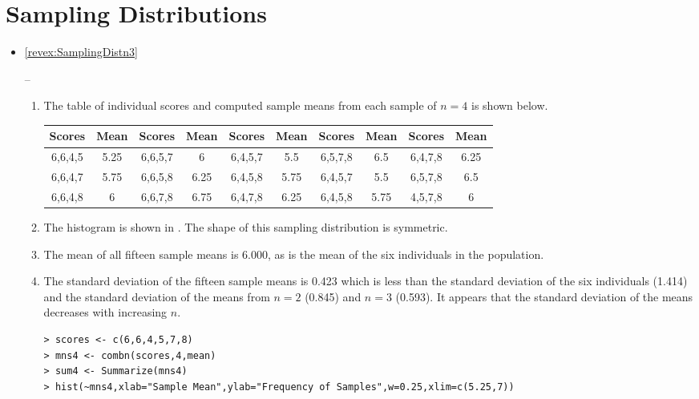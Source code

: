 \documentclass[10pt,openany]{book}\usepackage[]{graphicx}\usepackage[]{color}
\makeatletter
\newenvironment{kframe}{%
 \def\at@end@of@kframe{}%
 \ifinner\ifhmode%
  \def\at@end@of@kframe{\end{minipage}}%
  \begin{minipage}{\columnwidth}%
 \fi\fi%
 \def\FrameCommand##1{\hskip\@totalleftmargin \hskip-\fboxsep
 \colorbox{shadecolor}{##1}\hskip-\fboxsep
     \hskip-\linewidth \hskip-\@totalleftmargin \hskip\columnwidth}%
 \MakeFramed {\advance\hsize-\width
   \@totalleftmargin\z@ \linewidth\hsize
   \@setminipage}}%
 {\par\unskip\endMakeFramed%
 \at@end@of@kframe}
\newenvironment{knitrout}{}{} %
\makeatother
\begin{document}
\section*{Sampling Distributions}
\begin{itemize}
  \item \hypertarget{ans:SamplingDistn3}{\ref{revex:SamplingDistn3}} --
    \begin{enumerate}
      \item The table of individual scores and computed sample means from each sample of $n=4$ is shown below.
      \begin{center}
        \begin{tabular}{cc||cc||cc||cc||cc}
\hline\hline
Scores & Mean & Scores & Mean & Scores &  Mean & Scores & Mean & Scores & Mean \\
\hline
6,6,4,5 & 5.25 & 6,6,5,7 & 6    & 6,4,5,7 & 5.5  & 6,5,7,8 & 6.5  & 6,4,7,8 & 6.25 \\
6,6,4,7 & 5.75 & 6,6,5,8 & 6.25 & 6,4,5,8 & 5.75 & 6,4,5,7 & 5.5  & 6,5,7,8 & 6.5  \\
6,6,4,8 & 6    & 6,6,7,8 & 6.75 & 6,4,7,8 & 6.25 & 6,4,5,8 & 5.75 & 4,5,7,8 & 6    \\
\hline\hline
         \end{tabular}
      \end{center}

      \item The histogram is shown in .  The shape of this sampling distribution is symmetric.
\begin{knitrout}
\color{fgcolor}\begin{kframe}


{\ttfamily\noindent\bfseries\color{errorcolor}{Error: Variable must be numeric.}}\end{kframe}
\end{knitrout}
      \item The mean of all fifteen sample means is 6.000, as is the mean of the six individuals in the population.
      \item The standard deviation of the fifteen sample means is 0.423 which is less than the standard deviation of the six individuals (1.414) and the standard deviation of the means from $n=2$ (0.845) and $n=3$ (0.593).  It appears that the standard deviation of the means decreases with increasing $n$.
\begin{knitrout}
\color{fgcolor}\begin{kframe}
\begin{verbatim}
> scores <- c(6,6,4,5,7,8)
> mns4 <- combn(scores,4,mean)
> sum4 <- Summarize(mns4)
> hist(~mns4,xlab="Sample Mean",ylab="Frequency of Samples",w=0.25,xlim=c(5.25,7))
\end{verbatim}
\end{kframe}
\end{knitrout}
    \end{enumerate}


\end{itemize}
\end{document}
